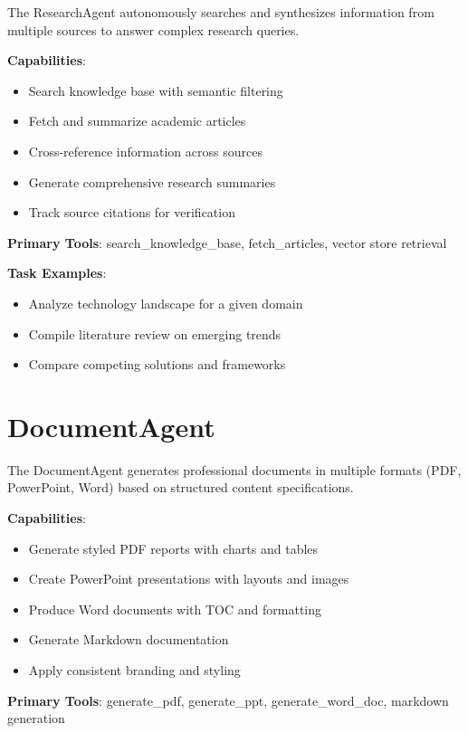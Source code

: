 \documentclass{report}
\begin{document}
The ResearchAgent autonomously searches and synthesizes information from multiple sources to answer complex research queries.

\textbf{Capabilities}:

\begin{itemize}
    \item Search knowledge base with semantic filtering
    \item Fetch and summarize academic articles
    \item Cross-reference information across sources
    \item Generate comprehensive research summaries
    \item Track source citations for verification
\end{itemize}

\textbf{Primary Tools}: search\_knowledge\_base, fetch\_articles, vector store retrieval

\textbf{Task Examples}:
\begin{itemize}
    \item Analyze technology landscape for a given domain
    \item Compile literature review on emerging trends
    \item Compare competing solutions and frameworks
\end{itemize}

\section{DocumentAgent}

The DocumentAgent generates professional documents in multiple formats (PDF, PowerPoint, Word) based on structured content specifications.

\textbf{Capabilities}:

\begin{itemize}
    \item Generate styled PDF reports with charts and tables
    \item Create PowerPoint presentations with layouts and images
    \item Produce Word documents with TOC and formatting
    \item Generate Markdown documentation
    \item Apply consistent branding and styling
\end{itemize}

\textbf{Primary Tools}: generate\_pdf, generate\_ppt, generate\_word\_doc, markdown generation
\end{document}
